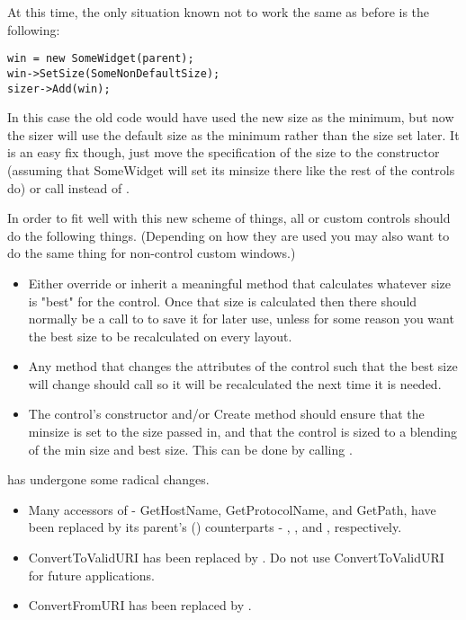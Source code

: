 At this time, the only situation known not to work the same as before is the following:

\begin{verbatim}
win = new SomeWidget(parent);
win->SetSize(SomeNonDefaultSize);
sizer->Add(win);
\end{verbatim}

In this case the old code would have used the new size as the minimum, but now the sizer will use the default size as the minimum rather than the size set later.  It is an easy fix though, just move the specification of the size to the constructor (assuming that SomeWidget will set its minsize there like the rest of the controls do) or call  instead of .

In order to fit well with this new scheme of things, all  or custom controls should do the following things. (Depending on how they are used you may also want to do the same thing for non-control custom windows.)

\begin{itemize}\itemsep=0pt
\item Either override or inherit a meaningful  method that calculates whatever size is "best" for the control.  Once that size is calculated then there should normally be a call to  to save it for later use, unless for some reason you want the best size to be recalculated on every layout.
\item Any method that changes the attributes of the control such that the best size will change should call  so it will be recalculated the next time it is needed.
\item The control's constructor and/or Create method should ensure that the minsize is set to the size passed in, and that the control is sized to a blending of the min size and best size.  This can be done by calling .
\end{itemize}


 has undergone some radical changes.

\begin{itemize}\itemsep=0pt
\item Many accessors of  - GetHostName, GetProtocolName, and GetPath, have been replaced by its parent's () counterparts - , , and , respectively.
\item ConvertToValidURI has been replaced by .  Do not use ConvertToValidURI for future applications.
\item ConvertFromURI has been replaced by .
\end{itemize}


